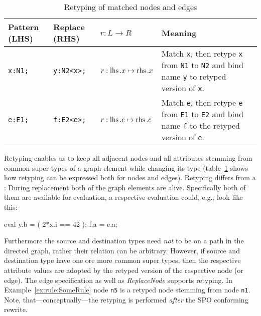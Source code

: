 \begin{table}[htbp]
\centering
\begin{tabularx}{\linewidth}{lllX}
  \textbf{Pattern (LHS)} & \textbf{Replace (RHS)} & \textbf{$r: L \longrightarrow R$} & \textbf{Meaning} \\ \hline
  \texttt{x:N1;} & \texttt{y:N2<x>;}          & $r:\operatorname{lhs}.x \mapsto \operatorname{rhs}.x$ & Match \texttt{x}, then retype \texttt{x} from \texttt{N1} to \texttt{N2} and bind name \texttt{y} to retyped version of \texttt{x}.\\
  \texttt{e:E1;} & \texttt{f:E2<e>;}          & $r:\operatorname{lhs}.e \mapsto \operatorname{rhs}.e$ & Match \texttt{e}, then retype \texttt{e} from \texttt{E1} to \texttt{E2} and bind name \texttt{f} to the retyped version of \texttt{e}.\\
\end{tabularx}
\caption{Retyping of matched nodes and edges}
\label{rule:retyping_graphlets}
\end{table}

Retyping enables us to keep all adjacent nodes and all attributes stemming from common super types of a graph element while changing its type (table~\ref{rule:retyping_graphlets} shows how retyping can be expressed both for nodes and edges).
Retyping differs from a : During replacement both of the graph elements are alive.
  Specifically both of them are available for evaluation, a respective evaluation could, e.g., look like this:
  \begin{grgenlet}
eval {
  y.b = ( 2*x.i == 42 );
  f.a = e.a;
}
  \end{grgenlet}
Furthermore the source and destination types need \emph{not} to be on a path in the directed  graph, rather their relation can be arbitrary.
However, if source and destination type have one ore more common super types, then the respective attribute values are adopted by the retyped version of the respective node (or edge).
The edge specification as well as \emph{ReplaceNode} supports retyping.
In Example~\ref{ex:rule:SomeRule} node \texttt{n5} is a retyped node stemming from node \texttt{n1}.
Note, that---conceptually---the retyping is performed \emph{after} the SPO conforming rewrite.

